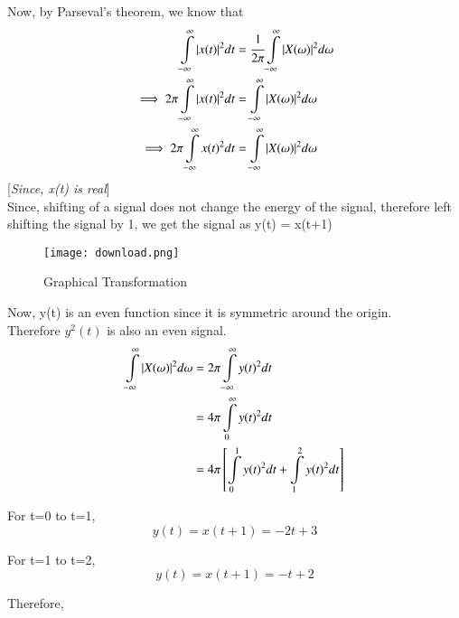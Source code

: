 \documentclass[journal,12pt,twocolumn]{IEEEtran}
\begin{document}
Now, by Parseval's theorem, we know that
\begin{align}
\displaystyle\int\limits_{-\infty}^{\infty} \vert x(t)\vert^2 dt &= \cfrac{1}{2\pi}\displaystyle\int\limits_{-\infty}^{\infty} \vert X(\omega)\vert^2 d\omega\\
\implies 2\pi \displaystyle\int\limits_{-\infty}^{\infty} \vert x(t)\vert^2 dt &= \displaystyle\int\limits_{-\infty}^{\infty} \vert X(\omega)\vert^2 d\omega\\
\implies 2\pi \displaystyle\int\limits_{-\infty}^{\infty} {x(t)}^2 dt &= \displaystyle\int\limits_{-\infty}^{\infty} \vert X(\omega)\vert^2 d\omega
\end{align}
[\textit{Since, x(t) is real}]\\

Since, shifting of a signal does not change the energy of the signal, therefore left shifting the signal by 1, we get the signal as y(t) = x(t+1)

\begin{figure}[!ht]
\centering
\texttt{[image: download.png]}
\caption{Graphical Transformation}
\end{figure}

Now, y(t) is an even function since it is symmetric around the origin.\\
Therefore $y^2(t)$ is also an even signal.\\

\begin{align}
  \displaystyle\int\limits_{-\infty}^{\infty} \vert X(\omega)\vert^2 d\omega &= 2\pi \displaystyle\int\limits_{-\infty}^{\infty} {y(t)}^2 dt\\
  &= 4\pi \displaystyle\int\limits_{0}^{\infty} {y(t)}^2 dt\\
  &= 4\pi \left[ \displaystyle\int\limits_{0}^{1} {y(t)}^2 dt +  \displaystyle\int\limits_{1}^{2} {y(t)}^2 dt\right]
\end{align}

For t=0 to t=1,\\
$$y(t) = x(t+1) = -2t + 3$$

For t=1 to t=2, \\
$$y(t) = x(t+1) = -t + 2$$

Therefore,\\
\end{document}
